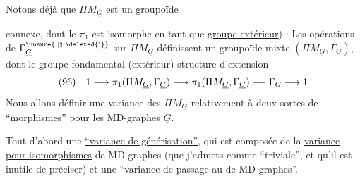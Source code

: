 Notons déjà que $\Pi M_{\underline G}$ est un groupoïde

connexe, dont le $\pi_1$ est isomorphe en tant que \uline{groupe extérieur}) :
Les opérations de $\Gamma^{\unsure{!|\natural|\deleted{!}}}_{\underline G}$ sur $\Pi M_{\underline G}$ définissent un groupoïde mixte $(\Pi M_{\underline G},\Gamma_G)$, dont le groupe fondamental (extérieur)    structure d'extension
\[
(96)\quad1\longrightarrow\pi_1(\Pi M_{\underline G},\Gamma_{\underline G})\longrightarrow\pi_1(\Pi M_{\underline G},\Gamma_{\underline G})\relbar\joinrel\relbar\Gamma_G\longrightarrow1
\]
Nous allons définir une  variance des $\Pi M_{\underline G}$ relativement à deux sortes de ``morphismes'' pour les MD-graphes $\underline G$. 

Tout d'abord une \uline{``variance de générisation''}, qui est composée de la \uline{variance pour isomorphismes} de MD-graphes (que j'admets comme ``triviale'', et qu'il est inutile de préciser) et une ``variance de passage au  de MD-graphes''.

